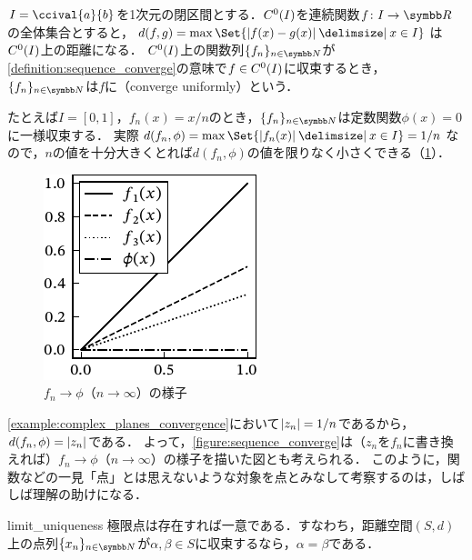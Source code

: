 \documentclass[../../main]{subfiles}
\begin{document}
\begin{example}[一様収束]
  \label{example:uniform_converge}
  \(I=\ccival{a}{b}\)を1次元の閉区間とする．\(C^0(I)\)を連続関数\(f\colon I\to\numset{R}\)の全体集合とすると，\(d(f,g)=\max\Set{\abs{f(x)-g(x)}\given x\in I}\)は\(C^0(I)\)上の距離になる．
  \(C^0(I)\)上の関数列\(\seq{f_n}_{n\in\numset{N}}\)が\cref{definition:sequence_converge}の意味で\(f\in C^0(I)\)に収束するとき，
  \(\seq{f_n}_{n\in\numset{N}}\)は\(f\)に（converge uniformly）という．

  たとえば\(I=[0,1]\)，\(f_n(x)=x/n\)のとき，\(\seq{f_n}_{n\in\numset{N}}\)は定数関数\(\phi(x)=0\)に一様収束する．
  実際\(d(f_n,\phi)=\max\Set{\abs{f_n(x)}\given x\in I}=1/n\)なので，\(n\)の値を十分大きくとれば\(d(f_n,\phi)\)の値を限りなく小さくできる（\cref{figure:uniform_converge}）．
\end{example}

\begin{figure}[htbp]
  \centering
  \includegraphics{func_convergence.pdf}
  \caption{\(f_n\to\phi\)（\(n\to\infty\)）の様子}
  \label{figure:uniform_converge}
\end{figure}

\begin{note}
  \cref{example:complex_planes_convergence}において\(\lvert z_n\rvert=1/n\)であるから，\(d(f_n,\phi)=\lvert z_n\rvert\)である．
  よって，\cref{figure:sequence_converge}は（\(z_n\)を\(f_n\)に書き換えれば）\(f_n\to\phi\)（\(n\to\infty\)）の様子を描いた図とも考えられる．
  このように，関数などの一見「点」とは思えないような対象を点とみなして考察するのは，しばしば理解の助けになる．
\end{note}

\begin{proposition}{}{limit_uniqueness}
  極限点は存在すれば一意である．すなわち，距離空間\((S,d)\)上の点列\(\seq{x_n}_{n\in\numset{N}}\)が\(\alpha,\beta\in S\)に収束するなら，\(\alpha=\beta\)である．
\end{proposition}
\end{document}
